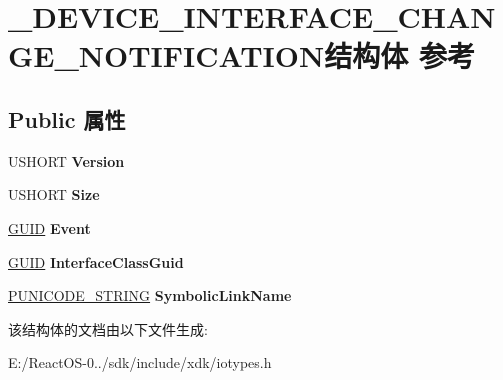 \hypertarget{struct___d_e_v_i_c_e___i_n_t_e_r_f_a_c_e___c_h_a_n_g_e___n_o_t_i_f_i_c_a_t_i_o_n}{}\section{\+\_\+\+D\+E\+V\+I\+C\+E\+\_\+\+I\+N\+T\+E\+R\+F\+A\+C\+E\+\_\+\+C\+H\+A\+N\+G\+E\+\_\+\+N\+O\+T\+I\+F\+I\+C\+A\+T\+I\+O\+N结构体 参考}
\label{struct___d_e_v_i_c_e___i_n_t_e_r_f_a_c_e___c_h_a_n_g_e___n_o_t_i_f_i_c_a_t_i_o_n}
\subsection*{Public 属性}
\begin{DoxyCompactItemize}
\item 
\mbox{\label{struct___d_e_v_i_c_e___i_n_t_e_r_f_a_c_e___c_h_a_n_g_e___n_o_t_i_f_i_c_a_t_i_o_n_a6cbaa339d133bbac4bed8f1c3b6345ef}} 
U\+S\+H\+O\+RT {\bfseries Version}
\item 
\mbox{\label{struct___d_e_v_i_c_e___i_n_t_e_r_f_a_c_e___c_h_a_n_g_e___n_o_t_i_f_i_c_a_t_i_o_n_a177518548474339632ebe61fd803f7ff}} 
U\+S\+H\+O\+RT {\bfseries Size}
\item 
\mbox{\label{struct___d_e_v_i_c_e___i_n_t_e_r_f_a_c_e___c_h_a_n_g_e___n_o_t_i_f_i_c_a_t_i_o_n_a56d65e28529602be216724822b87a09f}} 
\hyperlink{interface_g_u_i_d}{G\+U\+ID} {\bfseries Event}
\item 
\mbox{\label{struct___d_e_v_i_c_e___i_n_t_e_r_f_a_c_e___c_h_a_n_g_e___n_o_t_i_f_i_c_a_t_i_o_n_a1c6c995c0995bc93020252b4f0e08d3d}} 
\hyperlink{interface_g_u_i_d}{G\+U\+ID} {\bfseries Interface\+Class\+Guid}
\item 
\mbox{\label{struct___d_e_v_i_c_e___i_n_t_e_r_f_a_c_e___c_h_a_n_g_e___n_o_t_i_f_i_c_a_t_i_o_n_a4745b68af872e2dac27196ad1e3b9db9}} 
\hyperlink{struct___u_n_i_c_o_d_e___s_t_r_i_n_g}{P\+U\+N\+I\+C\+O\+D\+E\+\_\+\+S\+T\+R\+I\+NG} {\bfseries Symbolic\+Link\+Name}
\end{DoxyCompactItemize}


该结构体的文档由以下文件生成\+:\begin{DoxyCompactItemize}
\item 
E\+:/\+React\+O\+S-\/0../sdk/include/xdk/iotypes.\+h\end{DoxyCompactItemize}

